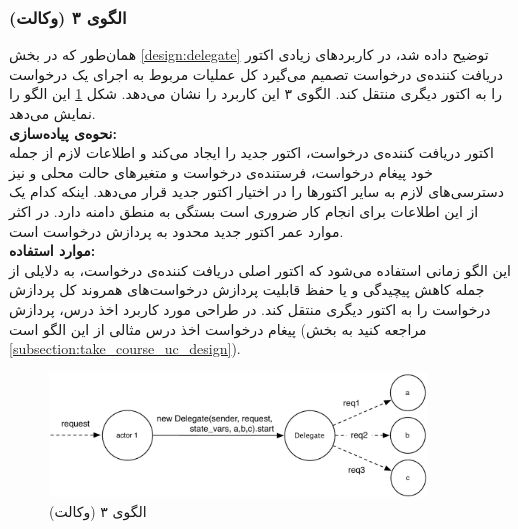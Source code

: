\subsubsection{الگوی ۳ (وکالت)}
همان‌طور که در بخش \ref{design:delegate} توضیح داده شد، در کاربردهای زیادی اکتور دریافت کننده‌ی درخواست تصمیم می‌گیرد کل عملیات مربوط به اجرای یک درخواست را به اکتور دیگری منتقل کند. الگوی ۳ این کاربرد را نشان می‌دهد. شکل \ref{fig:Patterns_stateless_delegate} این الگو را نمایش می‌دهد.\\
\textbf{نحوه‌ی پیاده‌سازی:}\\
 اکتور دریافت کننده‌ی درخواست، اکتور جدید را ایجاد می‌کند و اطلاعات لازم از جمله خود پیغام درخواست، فرستنده‌ی درخواست و متغیرهای حالت محلی و نیز دسترسی‌های لازم به سایر اکتورها را در اختیار اکتور جدید قرار می‌دهد. اینکه کدام یک از  این اطلاعات برای انجام کار ضروری است بستگی به منطق دامنه دارد. در اکثر موارد عمر اکتور جدید محدود به پردازش درخواست است.\\
 \textbf{موارد استفاده:}\\
این الگو زمانی استفاده می‌شود که اکتور اصلی دریافت کننده‌ی درخواست، به دلایلی از جمله کاهش پیچیدگی و یا حفظ قابلیت پردازش درخواست‌های همروند کل پردازش درخواست را به اکتور دیگری منتقل کند. در طراحی مورد کاربرد اخذ درس، پردازش پیغام درخواست اخذ درس مثالی از این الگو است (مراجعه کنید به بخش \ref{subsection:take_course_uc_design}).
\begin{figure}[hb]
    \begin{center}
	\includegraphics[width=10cm]{4-ProposedFramework/Figures/Patterns_stateless_Delegate.pdf}
    \end{center}
    \caption{\label{fig:Patterns_stateless_delegate}الگوی ۳ (وکالت)}
\end{figure}

